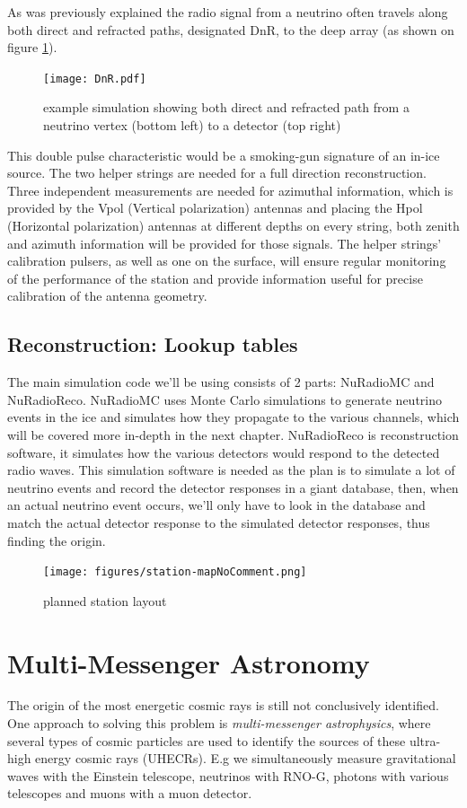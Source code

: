 As was previously explained the radio signal from a neutrino often travels
along both direct and refracted paths, designated DnR, to the deep array (as shown
on figure \ref{fig:DnR}).
\begin{figure}
  \centering
  \texttt{[image: DnR.pdf]}
  \caption{example simulation showing both direct and refracted path from a neutrino vertex (bottom left) to a detector (top right)}
  \label{fig:DnR}
\end{figure}
This double pulse characteristic would be a smoking-gun signature of an in-ice
source. The two helper strings are needed for a full direction reconstruction.
Three independent measurements are needed for azimuthal information, which is
provided by the Vpol (Vertical polarization) antennas and placing the Hpol
(Horizontal polarization) antennas at different depths on every string, both
zenith and azimuth information will be provided for those signals. The helper
strings' calibration pulsers, as well as one on the surface, will ensure
regular monitoring of the performance of the station and provide information
useful for precise calibration of the antenna geometry.
\subsection{Reconstruction: Lookup tables}
The main simulation code we'll be using consists of 2 parts:
NuRadioMC\cite{Glaser_2020} and NuRadioReco\cite{Glaser_2019}. NuRadioMC uses
Monte Carlo simulations to generate neutrino events in the ice and simulates
how they propagate to the various channels, which will be covered more in-depth
in the next chapter. NuRadioReco is reconstruction software, it simulates how
the various detectors would respond to the detected radio waves. This simulation
software is needed as the plan is to simulate a lot of neutrino events and
record the detector responses in a giant database, then, when an actual neutrino
event occurs, we'll only have to look in the database and match the actual
detector response to the simulated detector responses, thus finding the origin.
\begin{figure}
	\centering
	\texttt{[image: figures/station-mapNoComment.png]}	
	\caption{planned station layout }
	\label{fig:station map}
\end{figure}

\section{Multi-Messenger Astronomy}
The origin of the most energetic cosmic rays is still not conclusively
identified. One approach to solving this problem is \textit{multi-messenger
astrophysics}, where several types of cosmic particles are used to identify the
sources of these ultra-high energy cosmic rays (UHECRs). E.g we simultaneously
measure gravitational waves with the Einstein telescope, neutrinos with RNO-G,
photons with various telescopes and muons with a muon detector.

